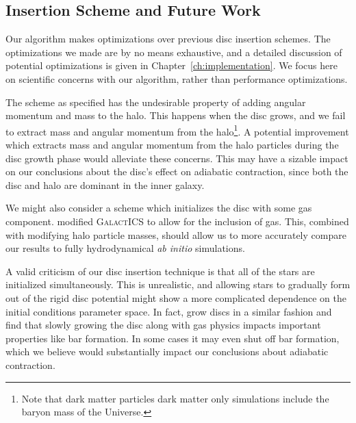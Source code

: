 
\subsection{Insertion Scheme and Future Work} \label{ssec:conclusions_insertion}

Our algorithm makes optimizations over previous disc insertion schemes. The optimizations we made are by no means exhaustive, and a detailed discussion of potential optimizations is given in Chapter~\ref{ch:implementation}. We focus here on scientific concerns with our algorithm, rather than performance optimizations. 

The scheme as specified has the undesirable property of adding angular momentum and mass to the halo. This happens when the disc grows, and we fail to extract mass and angular momentum from the halo\footnote{Note that dark matter particles dark matter only simulations include the baryon mass of the Universe.}. A potential improvement which extracts mass and angular momentum from the halo particles during the disc growth phase would alleviate these concerns. This may have a sizable impact on our conclusions about the disc's effect on adiabatic contraction, since both the disc and halo are dominant in the inner galaxy.

We might also consider a scheme which initializes the disc with some gas component. \citet{deg_2019} modified \textsc{GalactICS} to allow for the inclusion of gas. This, combined with modifying halo particle masses, should allow us to more accurately compare our results to fully hydrodynamical \textit{ab initio} simulations.

A valid criticism of our disc insertion technique is that all of the stars are initialized simultaneously. This is unrealistic, and allowing stars to gradually form out of the rigid disc potential might show a more complicated dependence on the initial conditions parameter space. In fact, \citet{aumer_2016} grow discs in a similar fashion and find that slowly growing the disc along with gas physics impacts important properties like bar formation. In some cases it may even shut off bar formation, which we believe would substantially impact our conclusions about adiabatic contraction.

